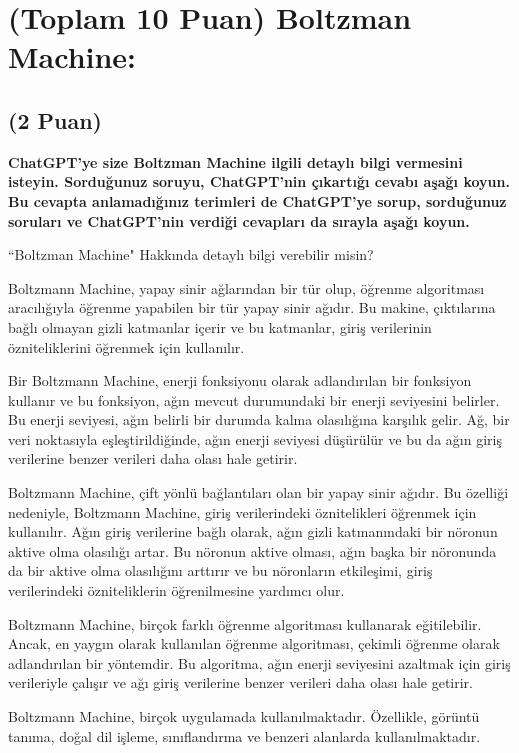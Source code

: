 \documentclass[11pt]{article}
\begin{document}
\section{(Toplam 10 Puan) Boltzman Machine:}

\subsection{(2 Puan)} \textbf{ChatGPT’ye size Boltzman Machine ilgili detaylı bilgi vermesini isteyin. Sorduğunuz soruyu, ChatGPT'nin çıkartığı cevabı aşağı koyun. Bu cevapta anlamadığınız terimleri de ChatGPT’ye sorup, sorduğunuz soruları ve ChatGPT’nin verdiği cevapları da sırayla aşağı koyun.}

“Boltzman Machine" Hakkında detaylı bilgi verebilir misin?

Boltzmann Machine, yapay sinir ağlarından bir tür olup, öğrenme algoritması aracılığıyla öğrenme yapabilen bir tür yapay sinir ağıdır. Bu makine, çıktılarına bağlı olmayan gizli katmanlar içerir ve bu katmanlar, giriş verilerinin özniteliklerini öğrenmek için kullanılır.

Bir Boltzmann Machine, enerji fonksiyonu olarak adlandırılan bir fonksiyon kullanır ve bu fonksiyon, ağın mevcut durumundaki bir enerji seviyesini belirler. Bu enerji seviyesi, ağın belirli bir durumda kalma olasılığına karşılık gelir. Ağ, bir veri noktasıyla eşleştirildiğinde, ağın enerji seviyesi düşürülür ve bu da ağın giriş verilerine benzer verileri daha olası hale getirir.

Boltzmann Machine, çift yönlü bağlantıları olan bir yapay sinir ağıdır. Bu özelliği nedeniyle, Boltzmann Machine, giriş verilerindeki öznitelikleri öğrenmek için kullanılır. Ağın giriş verilerine bağlı olarak, ağın gizli katmanındaki bir nöronun aktive olma olasılığı artar. Bu nöronun aktive olması, ağın başka bir nöronunda da bir aktive olma olasılığını arttırır ve bu nöronların etkileşimi, giriş verilerindeki özniteliklerin öğrenilmesine yardımcı olur.

Boltzmann Machine, birçok farklı öğrenme algoritması kullanarak eğitilebilir. Ancak, en yaygın olarak kullanılan öğrenme algoritması, çekimli öğrenme olarak adlandırılan bir yöntemdir. Bu algoritma, ağın enerji seviyesini azaltmak için giriş verileriyle çalışır ve ağı giriş verilerine benzer verileri daha olası hale getirir.

Boltzmann Machine, birçok uygulamada kullanılmaktadır. Özellikle, görüntü tanıma, doğal dil işleme, sınıflandırma ve benzeri alanlarda kullanılmaktadır.
\end{document}
